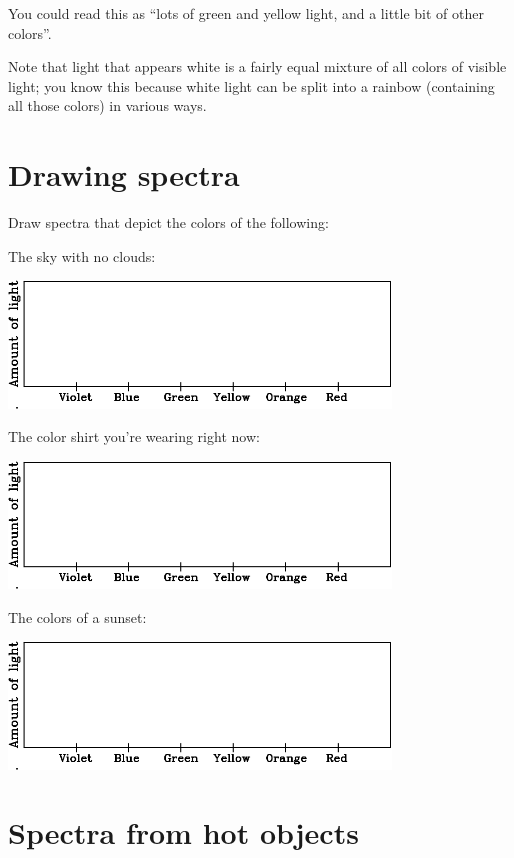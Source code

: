 \documentclass[11pt]{article}
\begin{document}
You could read this as ``lots of green and yellow light, and a little bit of other colors''. 

Note that light that appears white is a fairly equal mixture of all colors of visible light; you know this because white light can be split into a rainbow (containing all those colors) in various ways.

\newpage
\section{Drawing spectra}

Draw spectra that depict the colors of the following:

\begin{center}

\large

The sky with no clouds:

\includegraphics[width=4in]{blank-spectrum-crop.pdf}

\bigskip

The color shirt you're wearing right now:

\includegraphics[width=4in]{blank-spectrum-crop.pdf}
\bigskip

The colors of a sunset:

\includegraphics[width=4in]{blank-spectrum-crop.pdf}
\bigskip

\end{center}
\section{Spectra from hot objects}
\end{document}
